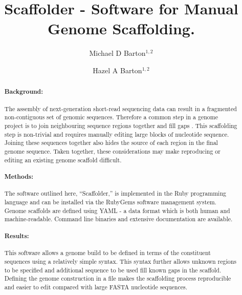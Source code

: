 \documentclass[10pt]{bmc_article}
\newenvironment{bmcformat}{\begin{raggedright}\baselineskip20pt\sloppy\setboolean{publ}{false}}{\end{raggedright}\baselineskip20pt\sloppy}
\begin{document}
\begin{bmcformat}

\title{Scaffolder - Software for Manual Genome
Scaffolding.}

\author{
  Michael D Barton$^{1,2}$\correspondingauthor%
\and
  Hazel A Barton$^{1,2}$%
      }


\address{
\iid(1) Biology Department, The University of Akron, Akron, %
OH 44325-3908, USA \\
\iid(2) Department of Biological Sciences, Northern Kentucky %
University, Nunn Drive, Highland Heights, KY 41076, USA}

\maketitle

\clearpage

\begin{abstract} %

  \paragraph*{Background:} The assembly of next-generation short-read
  sequencing data can result in a fragmented non-contiguous set of genomic
  sequences. Therefore a common step in a genome project is to join
  neighbouring sequence regions together and fill gaps . This scaffolding step
  is non-trivial and requires manually editing large blocks of nucleotide
  sequence. Joining these sequences together also hides the source of each
  region in the final genome sequence. Taken together, these considerations
  may make reproducing or editing an existing genome scaffold difficult.

  \paragraph*{Methods:} The software outlined here, ``Scaffolder,'' is
  implemented in the Ruby programming language and can be installed via the
  RubyGems software management system. Genome scaffolds are defined using
  YAML - a data format which is both human and machine-readable. Command line
  binaries and extensive documentation are available.

  \paragraph*{Results:} This software allows a genome build to be defined in
  terms of the constituent sequences using a relatively simple syntax. This
  syntax further allows unknown regions to be specified and additional sequence
  to be used fill known gaps in the scaffold. Defining the genome construction
  in a file makes the scaffolding process reproducible and easier to edit
  compared with large FASTA nucleotide sequences.


\end{abstract}
\end{bmcformat}
\end{document}
